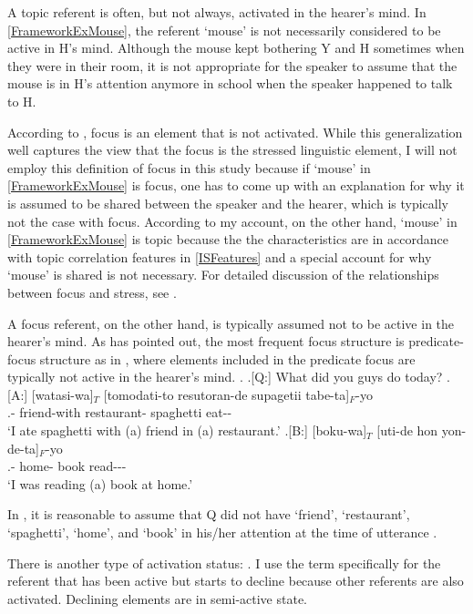 A topic referent is often, but not always, activated in the hearer's mind.
In \ref{FrameworkExMouse},
the referent `mouse' is not necessarily considered to be active in H's mind.
Although the mouse kept bothering Y and H sometimes when they were in their room,
it is not appropriate for the speaker to assume that the mouse is in H's attention anymore in school when the speaker happened to talk to H.

According to ,
focus is an element that is not activated.
While this generalization well captures the view that the focus is the stressed linguistic element,
I will not employ this definition of focus in this study
because if  `mouse' in \ref{FrameworkExMouse} is focus,
one has to come up with an explanation for why it is assumed to be shared between the speaker and the hearer,
which is typically not the case with focus.
According to my account, on the other hand,
 `mouse' in \ref{FrameworkExMouse} is topic because the the characteristics are in accordance with topic correlation features in \ref{ISFeatures}
and a special account for why  `mouse' is shared is not necessary.
For detailed discussion of the relationships between focus and stress,
see .

A focus referent, on the other hand, is typically assumed not to be active in the hearer's mind.
As  has pointed out,
the most frequent focus structure is predicate-focus structure as in \Next[A,B],
where elements included in the predicate focus are typically not active in the hearer's mind.
\ex.\label{tomodati} \a.[Q:] What did you guys do today?
	\bg.[A:] [watasi-wa]$_{T}$ [tomodati-to resutoran-de supagetii tabe-ta]$_{F}$-yo \\
			.- friend-with restaurant- spaghetti eat-- \\
			`I ate spaghetti with (a) friend in (a) restaurant.'
	\bg.[B:] [boku-wa]$_{T}$ [uti-de hon yon-de-ta]$_{F}$-yo \\
			.- home- book read--- \\
			`I was reading (a) book at home.'

In \Last,
it is reasonable to assume that
Q did not have `friend', `restaurant', `spaghetti', `home', and `book' in his/her attention at the time of utterance \Last[Q].

There is another type of activation status: .
I use the term  specifically for the referent that has been active but starts to decline because other referents are also activated.
Declining elements are in semi-active state.


